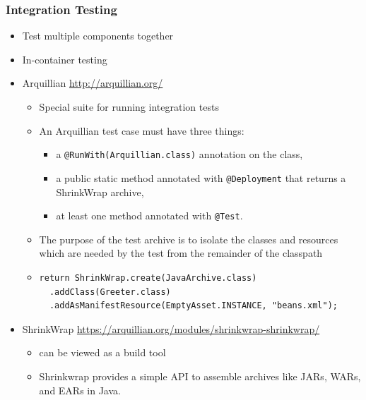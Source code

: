 \documentclass[10pt,xcolor=pdflatex]{beamer}
\begin{document}
\begin{frame}[fragile]\frametitle{Integration Testing}
\begin{itemize}
	\item Test multiple components together
	\item In-container testing
	\item Arquillian \url{http://arquillian.org/}
	  \begin{itemize}
		\item Special suite for running integration tests\\[0.05cm]
        \item An Arquillian test case must have three things:
          \begin{itemize}
            \item a \texttt{@RunWith(Arquillian.class)} annotation on the class,
            \item a public static method annotated with \texttt{@Deployment} that returns a ShrinkWrap archive,
            \item at least one method annotated with \texttt{@Test}.
          \end{itemize}
		\item The purpose of the test archive is to isolate the classes and resources which are needed by the test from the remainder of the classpath
        \item[] \begin{footnotesize}
        \begin{verbatim}
return ShrinkWrap.create(JavaArchive.class)
  .addClass(Greeter.class)
  .addAsManifestResource(EmptyAsset.INSTANCE, "beans.xml"); 
\end{verbatim}\end{footnotesize}
	  \end{itemize}
    \item ShrinkWrap {\footnotesize \url{https://arquillian.org/modules/shrinkwrap-shrinkwrap/}}
	  \begin{itemize}
		\item can be viewed as a build tool
        \item Shrinkwrap provides a simple API to assemble archives like JARs, WARs, and EARs in Java.
	  \end{itemize}
\end{itemize}
\end{frame}
\end{document}
